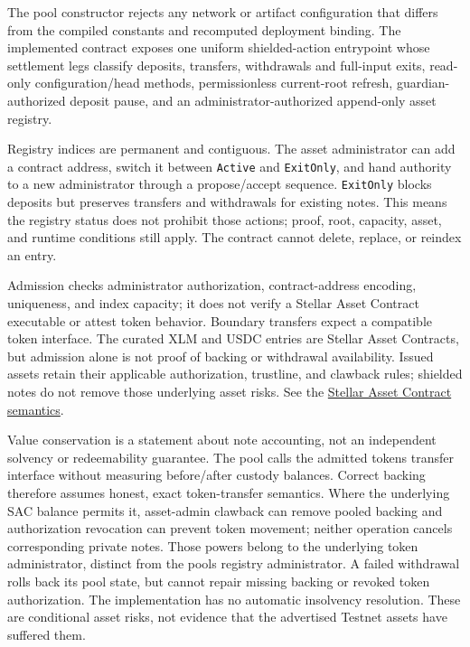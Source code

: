 \documentclass[11pt,letterpaper]{article}
\begin{document}
The pool constructor rejects any network or artifact configuration that
differs from the compiled constants and recomputed deployment binding.
The implemented contract exposes one uniform shielded-action entrypoint
whose settlement legs classify deposits, transfers, withdrawals and
full-input exits, read-only configuration/\allowbreak{}head methods,
permissionless current-root refresh, guardian-authorized deposit pause,
and an administrator-authorized append-only asset registry.

Registry indices are permanent and contiguous. The asset administrator
can add a contract address, switch it between \texttt{Active} and
\texttt{ExitOnly}, and hand authority to a new administrator through a
propose/\allowbreak{}accept sequence. \texttt{ExitOnly} blocks deposits
but preserves transfers and withdrawals for existing notes. This means
the registry status does not prohibit those actions; proof, root,
capacity, asset, and runtime conditions still apply. The contract cannot
delete, replace, or reindex an entry.

Admission checks administrator authorization, contract-address encoding,
uniqueness, and index capacity; it does not verify a Stellar Asset
Contract executable or attest token behavior. Boundary transfers expect
a compatible token interface. The curated XLM and USDC entries are
Stellar Asset Contracts, but admission alone is not proof of backing or
withdrawal availability. Issued assets retain their applicable
authorization, trustline, and clawback rules; shielded notes do not
remove those underlying asset risks. See the
\href{https://developers.stellar.org/docs/tokens/stellar-asset-contract}{Stellar
Asset Contract semantics}.

Value conservation is a statement about note accounting, not an
independent solvency or redeemability guarantee. The pool calls the
admitted token\textquotesingle s transfer interface without measuring
before/\allowbreak{}after custody balances. Correct backing therefore
assumes honest, exact token-transfer semantics. Where the underlying SAC
balance permits it, asset-admin clawback can remove pooled backing and
authorization revocation can prevent token movement; neither operation
cancels corresponding private notes. Those powers belong to the
underlying token administrator, distinct from the pool\textquotesingle s
registry administrator. A failed withdrawal rolls back its pool state,
but cannot repair missing backing or revoked token authorization. The
implementation has no automatic insolvency resolution. These are
conditional asset risks, not evidence that the advertised Testnet assets
have suffered them.
\end{document}
